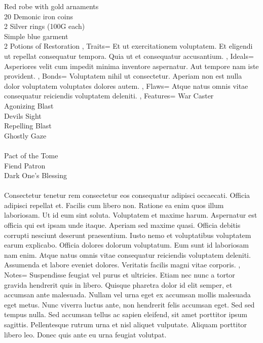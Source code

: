 \documentclass[10pt,a4paper]{scrbook}
\begin{document}
{{			Red robe with gold arnaments \\
			20 Demonic iron coins \\
			2 Silver rings (100G each) \\
			Simple blue garment \\
			2 Potions of Restoration 
		},
		Traits={
			Et ut exercitationem voluptatem. 
			Et eligendi ut repellat consequatur tempora. 
			Quia ut et consequatur accusantium.
		},
		Ideals={
			Asperiores velit cum impedit minima inventore aspernatur. 
			Aut tempore nam iste provident. 
		},
		Bonds={
			Voluptatem nihil ut consectetur. 
			Aperiam non est nulla dolor voluptatem voluptates dolores autem.
		},
		Flaws={
			Atque natus omnis vitae consequatur reiciendis voluptatem deleniti.
		},
		Features={
			War Caster \\
			Agonizing Blast \\
			Devils Sight \\
			Repelling Blast \\
			Ghostly Gaze \\
			\\
			Pact of the Tome \\
			Fiend Patron \\
			Dark One's Blessing \\
			\\
			Consectetur tenetur rem consectetur eos consequatur adipisci occaecati. 
			Officia adipisci repellat et. 
			Facilis cum libero non. 
			Ratione ea enim quos illum laboriosam.
			Ut id eum sint soluta. 
			Voluptatem et maxime harum. 
			Aspernatur est officia qui est ipsam unde itaque. 
			Aperiam sed maxime quasi. 
			Officia debitis corrupti nesciunt deserunt praesentium.
			Iusto nemo et voluptatibus voluptatem earum explicabo. 
			Officia dolores dolorum voluptatum. 
			Eum sunt id laboriosam nam enim. 
			Atque natus omnis vitae consequatur reiciendis voluptatem deleniti. 
			Assumenda et labore eveniet dolores. 
			Veritatis facilis magni vitae corporis.
		},
		Notes={
			Suspendisse feugiat vel purus et ultricies. 
			Etiam nec nunc a tortor gravida hendrerit quis in libero. 
			Quisque pharetra dolor id elit semper, 
			et accumsan ante malesuada. 
			Nullam vel urna eget ex accumsan mollis malesuada eget metus. 
			Nunc viverra luctus ante, non hendrerit felis accumsan eget.
			Sed sed tempus nulla. Sed accumsan tellus ac sapien eleifend, 
			sit amet porttitor ipsum sagittis. 
			Pellentesque rutrum urna et nisl aliquet vulputate. 
			Aliquam porttitor libero leo.
			Donec quis ante eu urna feugiat volutpat. 
		}
	}
\end{document}
